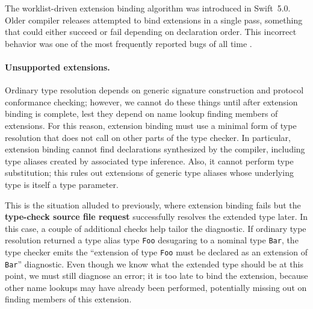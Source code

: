 \documentclass[../generics]{subfiles}
\begin{document}
The worklist-driven extension binding algorithm was introduced in Swift~5.0. Older compiler releases attempted to bind extensions in a single pass, something that could either succeed or fail depending on declaration order. This incorrect behavior was one of the most frequently reported bugs of all time \cite{sr631}.

%
\paragraph{Unsupported extensions.}
%
%
%
%
%
Ordinary type resolution depends on generic signature construction and protocol conformance checking; however, we cannot do these things until after extension binding is complete, lest they depend on name lookup finding members of extensions. For this reason, extension binding must use a minimal form of type resolution that does not call on other parts of the type checker. In particular, extension binding cannot find declarations synthesized by the compiler, including type aliases created by associated type inference. Also, it cannot perform type substitution; this rules out extensions of generic type aliases whose underlying type is itself a type parameter.

This is the situation alluded to previously, where extension binding fails but the \textbf{type-check source file request} successfully resolves the extended type later. In this case, a couple of additional checks help tailor the diagnostic. If ordinary type resolution returned a type alias type \texttt{Foo} desugaring to a nominal type \texttt{Bar}, the type checker emits the ``extension of type \texttt{Foo} must be declared as an extension of \texttt{Bar}'' diagnostic. Even though we know what the extended type should be at this point, we must still diagnose an error; it is too late to bind the extension, because other name lookups may have already been performed, potentially missing out on finding members of this extension.
\end{document}

